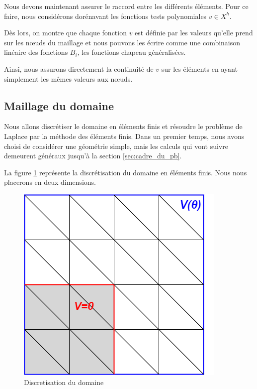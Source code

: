 \documentclass{article}
\begin{document}
Nous devons maintenant assurer le raccord entre les différents éléments.
Pour ce faire, nous considérons dorénavant les fonctions tests
polynomiales $v \in X^h$.

Dès lors, on montre que chaque fonction $v$
est définie par les valeurs qu'elle prend
sur les nœuds du maillage et nous pouvons les écrire comme une combinaison
linéaire des fonctions $B_i$, les fonctions chapeau généralisées.

Ainsi, nous assurons directement la continuité de $v$ sur les éléments en
ayant simplement les mêmes valeurs aux nœuds.

\newpage

\subsection{Maillage du domaine}

\hspace{0.5cm}
Nous allons discrétiser le domaine en éléments finis et résoudre le problème
de Laplace par la méthode des éléments finis. Dans un premier temps,
nous avons choisi de considérer une géométrie simple, mais les calculs
qui vont suivre demeurent généraux jusqu'à la section \ref{sec:cadre_du_pb}.

La figure \ref{fig:pointe_ef} représente la discrétisation du domaine en éléments
finis. Nous nous placerons en deux dimensions.

\begin{figure}[h]
    \centering
    \hspace{1cm} \includegraphics[scale= 0.7]{img/pointe_ef.png}
    \caption{Discretisation du domaine}
    \label{fig:pointe_ef}
\end{figure}
\end{document}
